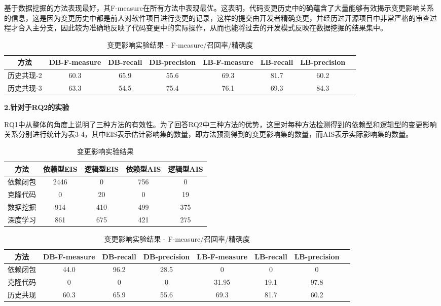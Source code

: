 基于数据挖掘的方法表现最好，其F-measure在所有方法中表现最优。这表明，代码变更历史中的确蕴含了大量能够有效揭示变更影响关系的信息，这是因为变更历史中都是前人对软件项目进行变更的记录，这样的提交由开发者精确变更，并经历过开源项目中非常严格的审查过程才合入主分支，因此较为准确地反映了代码变更中的实际操作，从而也能将过去的开发模式反映在数据挖掘的结果集中。

\begin{table}[htbp]
\caption{变更影响实验结果 - F-measure/召回率/精确度}
\vspace{0.5em}\centering\wuhao
\begin{tabular}{cccccccc}
\toprule
方法 & DB-F-measure & DB-recall & DB-precision & LB-F-measure & LB-recall & LB-precision  \\
\midrule
历史共现-2 & 60.3 & 65.9 & 55.6 & 69.3 & 81.7 & 60.2 \\
历史共现-3 & 63.3 & 54.5 & 75.4 & 76.1 & 69.3 & 84.3 \\
\bottomrule
\end{tabular}
\end{table}


\textbf{2.针对于RQ2的实验}

RQ1中从整体的角度上说明了三种方法的有效性。为了回答RQ2中三种方法的优势，这里对每种方法检测得到的依赖型和逻辑型的变更影响关系分别进行统计为表3-4，其中EIS表示估计影响集的数量，即方法预测得到的变更影响集的数量，而AIS表示实际影响集的数量。

\begin{table}[htbp]
\caption{变更影响实验结果}
\vspace{0.5em}\centering\wuhao
\begin{tabular}{ccccc}
\toprule
方法 & 依赖型EIS & 逻辑型EIS & 依赖型AIS & 逻辑型AIS  \\
\midrule
依赖闭包 & 2446 & 0 & 756 & 0 \\
克隆代码 & 0 & 20 &  0 & 19 \\
数据挖掘 & 914 &  410 & 499 & 375 \\
深度学习 & 861 & 675 & 421 & 275 \\
\bottomrule
\end{tabular}
\end{table}


\begin{table}[htbp]
\caption{变更影响实验结果 - F-measure/召回率/精确度}
\vspace{0.5em}\centering\wuhao
\begin{tabular}{cccccccc}
\toprule
方法 & DB-F-measure & DB-recall & DB-precision & LB-F-measure & LB-recall & LB-precision  \\
\midrule
依赖闭包 & 44.0 & 96.2 & 28.5 & 0 & 0 & 0 \\
克隆代码 & 0 & 0 &  0 & 31.95 & 19.1 & 97.8 \\
历史共现 & 60.3 & 65.9 & 55.6 & 69.3 & 81.7 & 60.2 \\
\bottomrule
\end{tabular}
\end{table}


